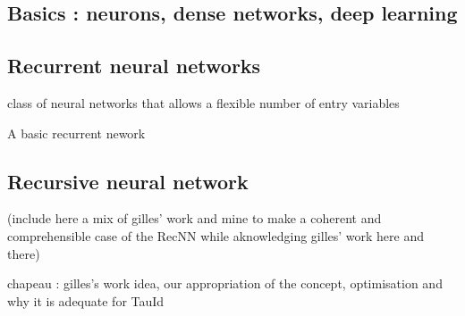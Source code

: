 \subsection{Basics : neurons, dense networks, deep learning}

\subsection{Recurrent neural networks}

class of neural networks that allows a flexible number of entry variables

A basic recurrent nework

\subsection{Recursive neural network}

(include here a mix of gilles' work and mine to make a coherent and comprehensible case of the RecNN while aknowledging gilles' work here and there)

chapeau : gilles's work idea, our appropriation of the concept, optimisation and why it is adequate for TauId